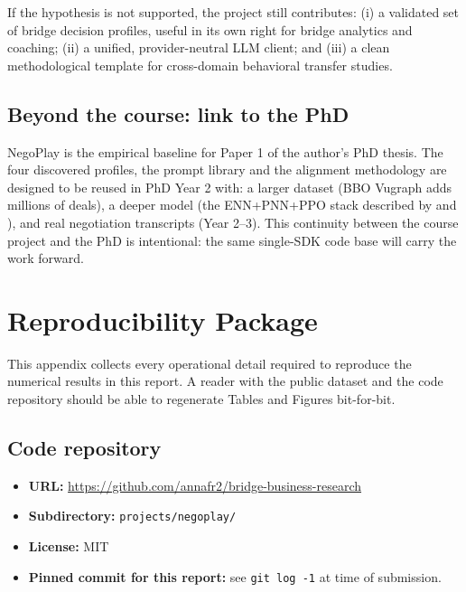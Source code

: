 \documentclass[11pt, a4paper, oneside, openany]{report}
\begin{document}
If the hypothesis is not supported, the project still contributes: (i) a validated set of bridge decision profiles, useful in its own right for bridge analytics and coaching; (ii) a unified, provider-neutral LLM client; and (iii) a clean methodological template for cross-domain behavioral transfer studies.

\section{Beyond the course: link to the PhD}

NegoPlay is the empirical baseline for Paper 1 of the author's PhD thesis. The four discovered profiles, the prompt library and the alignment methodology are designed to be reused in PhD Year 2 with: a larger dataset (BBO Vugraph adds millions of deals), a deeper model (the ENN+PNN+PPO stack described by \citealp{rong2019competitive} and \citealp{kita2024simple}), and real negotiation transcripts (Year 2--3). This continuity between the course project and the PhD is intentional: the same single-SDK code base will carry the work forward.

\appendix

\chapter{Reproducibility Package}
\label{app:repro}

This appendix collects every operational detail required to reproduce the numerical results in this report. A reader with the public dataset and the code repository should be able to regenerate Tables and Figures bit-for-bit.

\section{Code repository}

\begin{itemize}[leftmargin=*]
    \item \textbf{URL:} \url{https://github.com/annafr2/bridge-business-research}
    \item \textbf{Subdirectory:} \texttt{projects/negoplay/}
    \item \textbf{License:} MIT
    \item \textbf{Pinned commit for this report:} see \texttt{git log -1} at time of submission.
\end{itemize}
\end{document}

